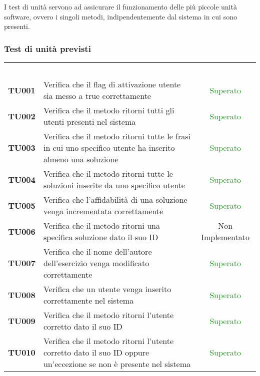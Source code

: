 I test di unità servono ad assicurare il funzionamento delle più piccole unità software, ovvero i singoli metodi, indipendentemente dal sistema in cui sono presenti.

\subsubsection{Test di unità previsti}

\begin{tabularx}{\textwidth}{cXc}
	
	\rowcolor{greySWEight}
	
	\rowcolor{greySWEight}
	\textcolor{white}{\textbf{Codice}} & 
	\textcolor{white}{\textbf{Descrizione}} &
	\textcolor{white}{\textbf{Stato}} \\
	
	\textbf{TU001} & Verifica che il flag di attivazione utente sia messo a true correttamente & \textcolor{ForestGreen}{Superato} \\
	\textbf{TU002} & Verifica che il metodo ritorni tutti gli utenti presenti nel sistema & \textcolor{ForestGreen}{Superato} \\
	\textbf{TU003} & Verifica che il metodo ritorni tutte le frasi in cui uno specifico utente ha inserito almeno una soluzione & \textcolor{ForestGreen}{Superato} \\
	\textbf{TU004} & Verifica che il metodo ritorni tutte le soluzioni inserite da uno specifico utente & \textcolor{ForestGreen}{Superato} \\
	\textbf{TU005} & Verifica che l'affidabilità di una soluzione venga incrementata correttamente & \textcolor{ForestGreen}{Superato} \\
	\textbf{TU006} & Verifica che il metodo ritorni una specifica soluzione dato il suo ID & Non Implementato \\
	\textbf{TU007} & Verifica che il nome dell'autore dell'esercizio venga modificato correttamente & \textcolor{ForestGreen}{Superato} \\
	\textbf{TU008} & Verifica che un utente venga inserito correttamente nel sistema & \textcolor{ForestGreen}{Superato} \\
	\textbf{TU009} & Verifica che il metodo ritorni l'utente corretto dato il suo ID & \textcolor{ForestGreen}{Superato} \\
	\textbf{TU010} & Verifica che il metodo ritorni l'utente corretto dato il suo ID oppure un'eccezione se non è presente nel sistema & \textcolor{ForestGreen}{Superato} \\

\end{tabularx}
